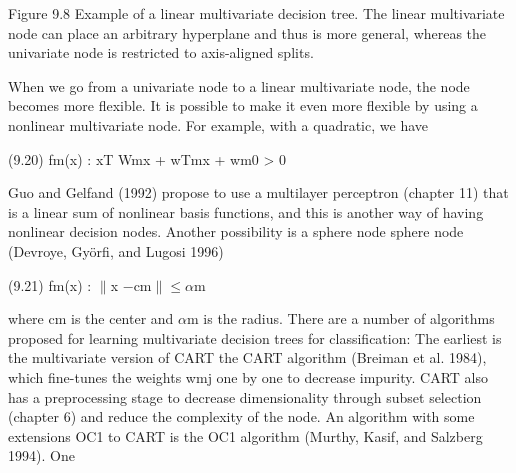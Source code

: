 Figure 9.8 Example of a linear multivariate decision tree. The linear multivariate node can place an arbitrary hyperplane and thus is more general, whereas the univariate node is restricted to axis-aligned splits.

When we go from a univariate node to a linear multivariate node, the node becomes more flexible. It is possible to make it even more flexible by using a nonlinear multivariate node. For example, with a quadratic, we have

(9.20) fm(x) : xT Wmx + wTmx + wm0 > 0

Guo and Gelfand (1992) propose to use a multilayer perceptron (chapter 11) that is a linear sum of nonlinear basis functions, and this is another way of having nonlinear decision nodes. Another possibility is a sphere node sphere node (Devroye, Györfi, and Lugosi 1996)

(9.21) fm(x) : $\parallel$x $-$cm$\parallel$$\leq$$\alpha$m

where cm is the center and $\alpha$m is the radius. There are a number of algorithms proposed for learning multivariate decision trees for classification: The earliest is the multivariate version of CART the CART algorithm (Breiman et al. 1984), which fine-tunes the weights wmj one by one to decrease impurity. CART also has a preprocessing stage to decrease dimensionality through subset selection (chapter 6) and reduce the complexity of the node. An algorithm with some extensions OC1 to CART is the OC1 algorithm (Murthy, Kasif, and Salzberg 1994). One

